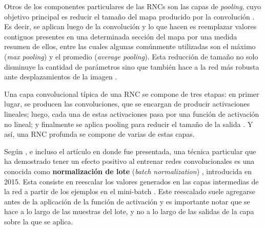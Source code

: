 \documentclass[../../main.tex]{subfiles}
\begin{document}
Otros de los componentes particulares de las RNCs son las capas de \textit{pooling}, cuyo
objetivo principal es reducir el tamaño del mapa producido por la convolución
\cite{hands-on-ML-sklearn-tf}. Es decir, se aplican luego de la convolución y lo que hacen
es reemplazar valores contiguos presentes en una determinada sección del mapa por una medida
resumen de ellos, entre las cuales algunas comúnmente utilizadas son el máximo
(\textit{max pooling}) y el promedio (\textit{average pooling}). Esta reducción de tamaño
no solo disminuye la cantidad de parámetros sino que también hace a la red más robusta
ante desplazamientos de la imagen \cite{hands-on-ML-sklearn-tf}.

Una capa convolucional típica de una RNC se compone de tres etapas: en primer lugar, se
producen las convoluciones, que se encargan de producir activaciones lineales; luego, cada
una de estas activaciones pasa por una función de activación no lineal; y finalmente se
aplica pooling para reducir el tamaño de la salida \cite{deep-learning}. Y así, una RNC
profunda se compone de varias de estas capas.

Según \cite{deep-learning}, \cite{hands-on-ML-sklearn-tf} e incluso el artículo
\cite{batch-norm} en donde fue presentada, una técnica particular que ha demostrado tener
un efecto positivo al entrenar redes convolucionales es una conocida como
\textbf{normalización de lote} (\textit{batch normalization}) \cite{batch-norm},
introducida en 2015. Esta consiste en reescalar los valores generados en las capas
intermedias de la red a partir de los ejemplos en el mini-batch
\cite{ai-a-modern-approach}. Este reescalado suele agregarse antes de la aplicación de la
función de activación y es importante notar que se hace a lo largo de las muestras del
lote, y no a lo largo de las salidas de la capa sobre la que se aplica.
\end{document}
